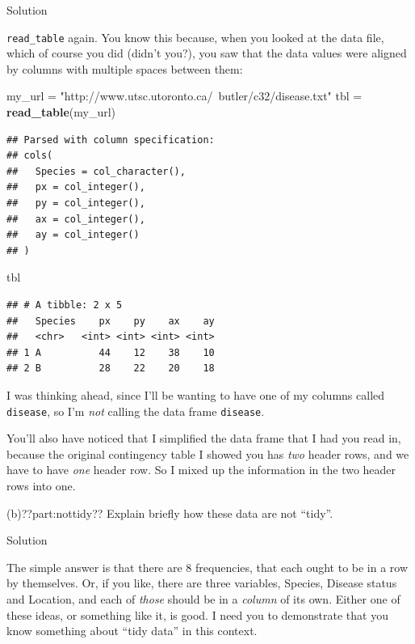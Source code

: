 \documentclass[]{tufte-book}
\newenvironment{Shaded}{}{}
\newcommand{\KeywordTok}[1]{\textcolor[rgb]{0.00,0.44,0.13}{\textbf{#1}}}
\newcommand{\NormalTok}[1]{#1}
\newcommand{\StringTok}[1]{\textcolor[rgb]{0.25,0.44,0.63}{#1}}
\theoremstyle{definition}
\theoremstyle{definition}
\theoremstyle{definition}
\theoremstyle{remark}
\begin{document}
Solution

\texttt{read\_table} again. You know this because, when you looked at
the data file, which of course you did (didn't you?), you saw that the
data values were aligned by columns with multiple spaces between them:

\begin{Shaded}
\begin{Highlighting}[]
\NormalTok{my_url =}\StringTok{ "http://www.utsc.utoronto.ca/~butler/c32/disease.txt"}
\NormalTok{tbl =}\StringTok{ }\KeywordTok{read_table}\NormalTok{(my_url)}
\end{Highlighting}
\end{Shaded}

\begin{verbatim}
## Parsed with column specification:
## cols(
##   Species = col_character(),
##   px = col_integer(),
##   py = col_integer(),
##   ax = col_integer(),
##   ay = col_integer()
## )
\end{verbatim}

\begin{Shaded}
\begin{Highlighting}[]
\NormalTok{tbl}
\end{Highlighting}
\end{Shaded}

\begin{verbatim}
## # A tibble: 2 x 5
##   Species    px    py    ax    ay
##   <chr>   <int> <int> <int> <int>
## 1 A          44    12    38    10
## 2 B          28    22    20    18
\end{verbatim}

I was thinking ahead, since I'll be wanting to have one of my columns
called \texttt{disease}, so I'm \emph{not} calling the data frame
\texttt{disease}.

You'll also have noticed that I simplified the data frame that I had you
read in, because the original contingency table I showed you has
\emph{two} header rows, and we have to have \emph{one} header row. So I
mixed up the information in the two header rows into one.

(b)??part:nottidy?? Explain briefly how these data are not ``tidy''.

Solution

The simple answer is that there are 8 frequencies, that each ought to be
in a row by themselves. Or, if you like, there are three variables,
Species, Disease status and Location, and each of \emph{those} should be
in a \emph{column} of its own. Either one of these ideas, or something
like it, is good. I need you to demonstrate that you know something
about ``tidy data'' in this context.
\end{document}

